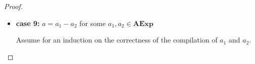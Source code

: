 \documentclass{article}
\begin{document}
\begin{proof}
\begin{itemize}
    \[
      \begin{aligned}
        \langle  \mathcal{CA}(a) : c,\, e,\, \sigma,\, s,\, pc \rangle 
        &= \langle \mathcal{CA}(a_1 \ast a_2) : c,\, e,\, \sigma,\, s,\, pc \rangle \\
        &= \langle \mathcal{CA}(a_2) : \mathcal{CA}(a_1) : \texttt{MUL} :  c,\, e,\, \sigma,\, s,\, pc \rangle 
        && \text{(definition of $\mathcal{CA}$)} \\
        &\triangleright^{\ast} \langle \mathcal{CA}(a_1) : \texttt{MUL} :  c,\, \mathcal{A}(a_2, \sigma, s) : e,\, \sigma,\, s,\, pc + l_2 \rangle 
        && \text{(induction hypothesis 2)} \\
        &\triangleright^{\ast} \langle \texttt{MUL} :  c,\, \mathcal{A}(a_1, \sigma, s) : \mathcal{A}(a_2, \sigma, s) : e,\, \sigma,\, s,\, pc + l_2 + l_1 \rangle 
        && \text{(induction hypothesis 1)} \\
        &\triangleright \langle c,\, (\mathcal{A}(a_1, \sigma, s) \cdot \mathcal{A}(a_2, \sigma, s)) : e,\, \sigma,\, s,\, pc + l_2 + l_1 + 1 \rangle 
        && \text{(operational semantics)} \\
        &= \langle c,\, \mathcal{A}(a_1 \ast a_2, \sigma, s) : e,\, \sigma,\, s,\, pc + l_2 + l_1 + 1 \rangle
        && \text{(definition of $\mathcal{A}$)} \\
        &= \langle c,\, \mathcal{A}(a, \sigma, s) : e,\, \sigma,\, s,\, pc + l_2 + l_1 + 1 \rangle \\
      \end{aligned}
  \]

    \newpage
    \item \textbf{case 9: } $a = a_1 - a_2$ for some $a_1, a_2 \in \textbf{AExp}$

    Assume for an induction on the correctness of the compilation of $a_1$ and $a_2$.


\end{itemize}
\end{proof}
\end{document}
